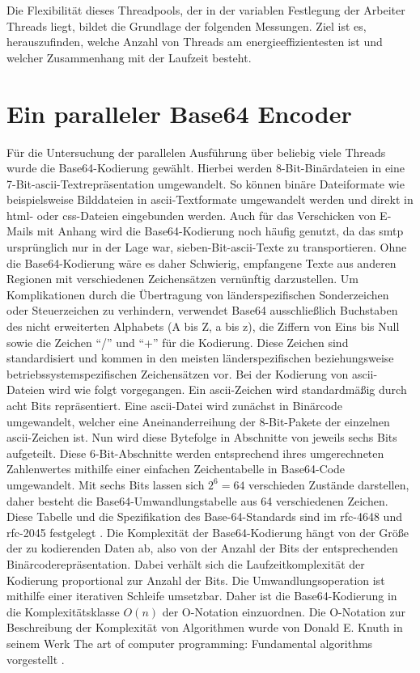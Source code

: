Die Flexibilität dieses Threadpools, der in der variablen Festlegung der Arbeiter Threads liegt, bildet die Grundlage der folgenden Messungen. Ziel ist es, herauszufinden, welche Anzahl von Threads am energieeffizientesten ist und welcher Zusammenhang mit der Laufzeit besteht.

\section{Ein paralleler Base64 Encoder}

Für die Untersuchung der parallelen Ausführung über beliebig viele Threads wurde die Base64-Kodierung gewählt. Hierbei werden 8-Bit-Binärdateien in eine 7-Bit-\ac{ascii}-Textrepräsentation umgewandelt. So können binäre Dateiformate wie beispielsweise Bilddateien in \ac{ascii}-Textformate umgewandelt werden und direkt in \ac{html}- oder \ac{css}-Dateien eingebunden werden. Auch für das Verschicken von E-Mails mit Anhang wird die Base64-Kodierung noch häufig genutzt, da das \ac{smtp} ursprünglich nur in der Lage war, sieben-Bit-\ac{ascii}-Texte zu transportieren. Ohne die Base64-Kodierung wäre es daher Schwierig, empfangene Texte aus anderen Regionen mit verschiedenen Zeichensätzen vernünftig darzustellen. Um Komplikationen durch die Übertragung von länderspezifischen Sonderzeichen oder Steuerzeichen zu verhindern, verwendet Base64 ausschließlich Buchstaben des nicht erweiterten Alphabets (A bis Z, a bis z), die Ziffern von Eins bis Null sowie die Zeichen \enquote{/} und \enquote{+} für die Kodierung. Diese Zeichen sind standardisiert und kommen in den meisten länderspezifischen beziehungsweise betriebssystemspezifischen Zeichensätzen vor. Bei der Kodierung von \ac{ascii}-Dateien wird wie folgt vorgegangen. Ein \ac{ascii}-Zeichen wird standardmäßig durch acht Bits repräsentiert. Eine \ac{ascii}-Datei wird zunächst in Binärcode umgewandelt, welcher eine Aneinanderreihung der 8-Bit-Pakete der einzelnen \ac{ascii}-Zeichen ist. Nun wird diese Bytefolge in Abschnitte von jeweils sechs Bits aufgeteilt. Diese 6-Bit-Abschnitte werden entsprechend ihres umgerechneten Zahlenwertes mithilfe einer einfachen Zeichentabelle in Base64-Code umgewandelt. Mit sechs Bits lassen sich $2^{ 6 } = 64$ verschieden Zustände darstellen, daher besteht die Base64-Umwandlungstabelle aus 64 verschiedenen Zeichen. Diese Tabelle und die Spezifikation des Base-64-Standards sind im \ac{rfc}-4648 \cite{base64-rfc4648} und \ac{rfc}-2045 festgelegt \cite{base64-rfc2045}. Die Komplexität der Base64-Kodierung hängt von der Größe der zu kodierenden Daten ab, also von der Anzahl der Bits der entsprechenden Binärcoderepräsentation. Dabei verhält sich die Laufzeitkomplexität der Kodierung proportional zur Anzahl der Bits. Die Umwandlungsoperation ist mithilfe einer iterativen Schleife umsetzbar. Daher ist die Base64-Kodierung in die Komplexitätsklasse $O(n)$ der O-Notation einzuordnen. Die O-Notation zur Beschreibung der Komplexität von Algorithmen wurde von Donald E. Knuth in seinem Werk \glqq The art of computer programming: Fundamental algorithms\grqq{} vorgestellt \cite[107]{knuth1}.

